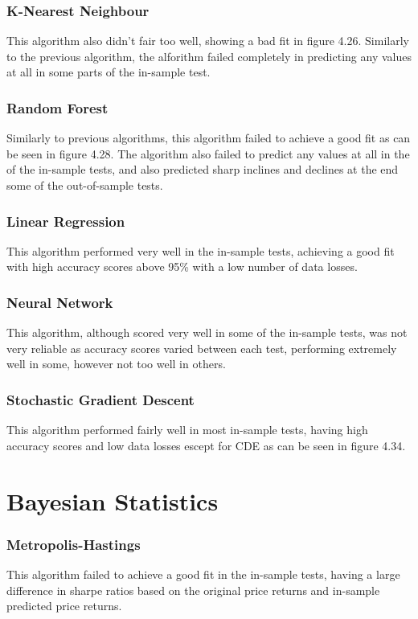 \subsubsection{K-Nearest Neighbour}
This algorithm also didn't fair too well, showing a bad fit in figure 4.26. Similarly to the previous algorithm, the alforithm failed completely in predicting any values at all in some parts of the in-sample test.

\subsubsection{Random Forest}
Similarly to previous algorithms, this algorithm failed to achieve a good fit as can be seen in figure 4.28. The algorithm also failed to predict any values at all in the of the in-sample tests, and also predicted sharp inclines and declines at the end some of the out-of-sample tests.

\subsubsection{Linear Regression} 
This algorithm performed very well in the in-sample tests, achieving a good fit with high accuracy scores above 95\% with a low number of data losses.

\subsubsection{Neural Network}
This algorithm, although scored very well in some of the in-sample tests, was not very reliable as accuracy scores varied between each test, performing extremely well in some, however not too well in others. 

\subsubsection{Stochastic Gradient Descent}
This algorithm performed fairly well in most in-sample tests, having high accuracy scores and low data losses escept for CDE as can be seen in figure 4.34.

\section{Bayesian Statistics}

\subsubsection{Metropolis-Hastings}
This algorithm failed to achieve a good fit in the in-sample tests, having a large difference in sharpe ratios based on the original price returns and in-sample predicted price returns. 

